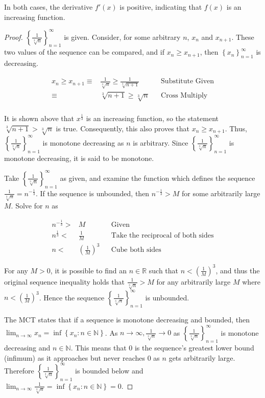 \documentclass[12pt]{article}
\newcommand{\set}[1]{\left\{ {#1} \right\}}
\newcommand{\limtoinf}[1]{\lim_{ {#1} \to\infty}}
\newcommand{\seq}[2][n]{\left\{ {#2} \right\}_{#1=1}^\infty}
\newcommand{\paren}[1]{\left( {#1} \right)}
\newcommand{\bR}{\mathbb{R}}
\newcommand{\bN}{\mathbb{N}}
\begin{document}
\noindent In both cases, the derivative $f'(x)$ is positive, indicating that $f(x)$ is an increasing function.
\begin{proof}
	$\seq{\frac{1}{\sqrt[3]{n}}}$ is given. Consider, for some arbitrary $n$, $x_n$ and $x_{n+1}$. These two values of the sequence can be compared, and if $x_n\ge x_{n+1}$, then $\seq{x_n}$ is decreasing.
	
\begin{align*}
	x_n\ge x_{n+1}\equiv&\frac{1}{\sqrt[3]{n}}\ge\frac{1}{\sqrt[3]{n+1}} && \text{Substitute Given} \\
	\equiv& \sqrt[3]{n+1} \ge \sqrt[3]{n} && \text{Cross Multiply} \\
\end{align*}

\noindent It is shown above that $x^\frac{1}{3}$ is an increasing function, so the statement $\sqrt[3]{n+1} > \sqrt[3]{n}$ is true. Consequently, this also proves that $x_n\ge x_{n+1}$. Thus, $\seq{\frac{1}{\sqrt[3]{n}}}$ is monotone decreasing as $n$ is arbitrary. Since $\seq{\frac{1}{\sqrt[3]{n}}}$ is monotone decreasing, it is said to be monotone.

\indent Take $\seq{\frac{1}{\sqrt[3]{n}}}$ as given, and examine the function which defines the sequence $\frac{1}{\sqrt[3]{n}}=n^{-\frac{1}{3}}$. If the sequence is unbounded, then $n^{-\frac{1}{3}}>M$ for some arbitrarily large $M$. Solve for $n$ as

\begin{align*}
	n^{-\frac{1}{3}}>&M && \text{Given} \\
	n^{\frac{1}{3}}<&\frac{1}{M} && \text{Take the reciprocal of both sides} \\
	n <& \paren{\frac{1}{M}}^3 && \text{Cube both sides}
\end{align*}

\noindent For any $M>0$, it is possible to find an $n\in\bR$ such that $n<\paren{\frac{1}{M}}^3$, and thus the original sequence inequality holds that $\frac{1}{\sqrt[3]{n}}>M$ for any arbitrarily large $M$ where $n<\paren{\frac{1}{M}}^3$. Hence the sequence $\seq{\frac{1}{\sqrt[3]{n}}}$ is unbounded.

\indent The MCT states that if a sequence is monotone decreasing and bounded, then $\limtoinf{n}x_n = \inf\set{x_n:n\in\bN}$. As $n\to\infty, \frac{1}{\sqrt[3]{n}}\to0$ as $\seq{\frac{1}{\sqrt[3]{n}}}$ is monotone decreasing and $n\in\bN$. This means that 0 is the sequence's greatest lower bound (infimum) as it approaches but never reaches 0 as $n$ gets arbitrarily large. Therefore $\seq{\frac{1}{\sqrt[3]{n}}}$ is bounded below and $\limtoinf{n}\frac{1}{\sqrt[3]{n}} = \inf\set{x_n:n\in\bN}=0$.
\end{proof}
\end{document}
